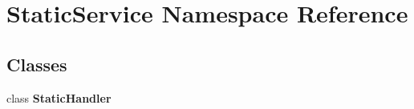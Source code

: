 \section{Static\+Service Namespace Reference}
\label{namespaceStaticService}
\subsection*{Classes}
\begin{DoxyCompactItemize}
\item 
class {\bf Static\+Handler}
\end{DoxyCompactItemize}
